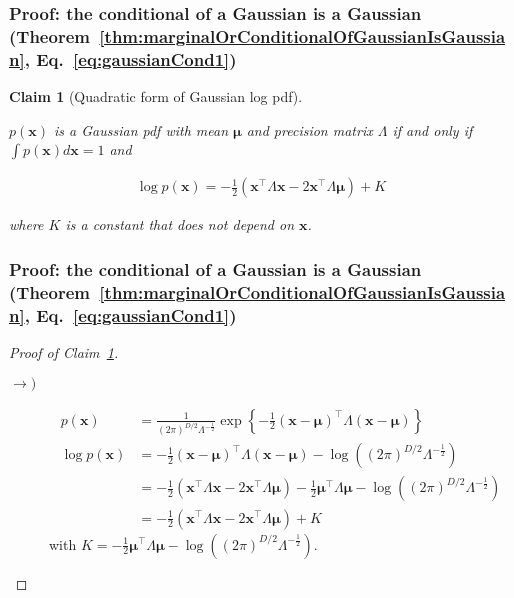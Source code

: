 \documentclass{beamer}
\newtheorem{claim}{Claim}
\begin{document}
\begin{frame}
    \frametitle{Proof: the conditional of a Gaussian is a Gaussian (Theorem~\ref{thm:marginalOrConditionalOfGaussianIsGaussian}, Eq.~\ref{eq:gaussianCond1})}

	\begin{claim}[Quadratic form of Gaussian log pdf]
		\label{claim:quadratricFormOfGaussianPDF}

		$p(\mathbf{x})$ is a Gaussian pdf with mean $\boldsymbol{\mu}$ and precision matrix $\Lambda$ if and only if $\int p(\mathbf{x}) d\mathbf{x}=1$ and

		\begin{align}
			\log p(\mathbf{x})=-\frac{1}{2}(\mathbf{x}^\intercal\Lambda\mathbf{x}-2\mathbf{x}^\intercal\Lambda\boldsymbol{\mu})+K\label{eq:gaussianQuadratic}
		\end{align}

		where $K$ is a constant that does not depend on $\mathbf{x}$.

	\end{claim}

\end{frame}

\begin{frame}
    \frametitle{Proof: the conditional of a Gaussian is a Gaussian (Theorem~\ref{thm:marginalOrConditionalOfGaussianIsGaussian}, Eq.~\ref{eq:gaussianCond1})}

	\begin{proof}[Proof of Claim~\ref{claim:quadratricFormOfGaussianPDF}]

		\scriptsize
		\begin{description}
			\item[$\rightarrow)$]

				\begin{align*}
					p(\mathbf{x})&=\frac{1}{(2\pi)^{D/2}\Lambda^{-\frac{1}{2}}}\exp\left\{-\frac{1}{2}(\mathbf{x}-\boldsymbol{\mu})^\intercal\Lambda(\mathbf{x}-\boldsymbol{\mu})\right\}\\
					\log p(\mathbf{x})&=-\frac{1}{2}(\mathbf{x}-\boldsymbol{\mu})^\intercal\Lambda(\mathbf{x}-\boldsymbol{\mu})-\log ((2\pi)^{D/2}\Lambda^{-\frac{1}{2}})\\
					                  &=-\frac{1}{2}(\mathbf{x}^\intercal\Lambda\mathbf{x}-2\mathbf{x}^\intercal\Lambda\boldsymbol{\mu})-\frac{1}{2}\boldsymbol{\mu}^\intercal\Lambda\boldsymbol{\mu}-\log ((2\pi)^{D/2}\Lambda^{-\frac{1}{2}})\\
					                  &=-\frac{1}{2}(\mathbf{x}^\intercal\Lambda\mathbf{x}-2\mathbf{x}^\intercal\Lambda\boldsymbol{\mu})+K
				\end{align*}
				with $K=-\frac{1}{2}\boldsymbol{\mu}^\intercal\Lambda\boldsymbol{\mu}-\log ((2\pi)^{D/2}\Lambda^{-\frac{1}{2}})$.
				\phantom\qedhere
		\end{description}
		\normalsize
	\end{proof}
\end{frame}
\end{document}
